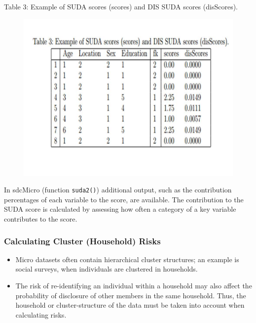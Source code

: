 \documentclass{beamer}
\begin{document}
	\begin{frame}
		Table 3: Example of SUDA scores (scores) and DIS SUDA scores (disScores).
		\begin{figure}
			\centering
			\includegraphics[width=0.99\linewidth]{JPEGS/TemplTable3}
			\caption{}
			\label{fig:TemplTable3}
		\end{figure}
		
	\end{frame}
	\begin{frame}
		In sdcMicro (function \texttt{suda2()}) additional output, such as the contribution
		percentages of each variable to the score, are available. The contribution to the
		SUDA score is calculated by assessing how often a category of a key variable
		contributes to the score.
	\end{frame}
	\begin{frame}
		\frametitle{Calculating Cluster (Household) Risks}
		\begin{itemize}
			\item Micro datasets often contain hierarchical cluster structures; an example is social
			surveys, when individuals are clustered in households. 
			\item The risk of re-identifying
			an individual within a household may also affect the probability of disclosure of
			other members in the same household. Thus, the household or cluster-structure of
			the data must be taken into account when calculating risks.
		\end{itemize}
	\end{frame}
\end{document}
